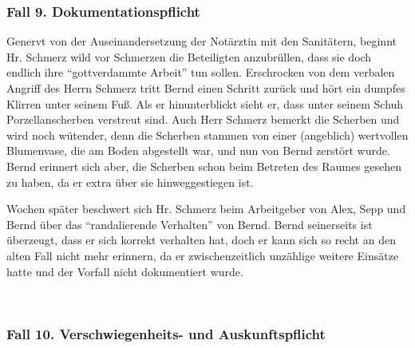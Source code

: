 \subsubsection{Fall 9. Dokumentationspflicht}
\label{topic:jus-langer-dienst-fall-9}
\label{topic:dokumentationspflicht-fallbeispiel}


{Genervt von der Auseinandersetzung der Notärztin mit den
Sanitätern, beginnt Hr. Schmerz wild vor Schmerzen die
Beteiligten anzubrüllen, dass sie doch endlich ihre
\enquote{gottverdammte Arbeit} tun sollen.
Erschrocken von dem verbalen Angriff des Herrn Schmerz tritt
Bernd einen Schritt zurück und hört ein dumpfes Klirren
unter seinem Fuß. Als er hinunterblickt sieht er, dass unter
seinem Schuh Porzellanscherben verstreut sind. Auch Herr
Schmerz bemerkt die Scherben und wird noch wütender, denn
die Scherben stammen von einer (angeblich) wertvollen
Blumenvase, die am Boden abgestellt war, und nun von Bernd
zerstört wurde. Bernd erinnert sich aber, die Scherben schon
beim Betreten des Raumes gesehen zu haben, da er extra über
sie hinweggestiegen ist.

Wochen später beschwert sich Hr. Schmerz beim
Arbeitgeber von Alex, Sepp und Bernd über das
\enquote{randalierende Verhalten} von Bernd. Bernd seinerseits ist
überzeugt, dass er sich korrekt verhalten hat, doch er kann sich so recht an den alten Fall nicht mehr
erinnern, da er zwischenzeitlich unzählige weitere
Einsätze hatte und der Vorfall nicht dokumentiert
wurde.}{}{}{}{}




~


\subsubsection{Fall 10. Verschwiegenheits- und Auskunftspflicht}
\label{topic:jus-langer-dienst-fall-10}




